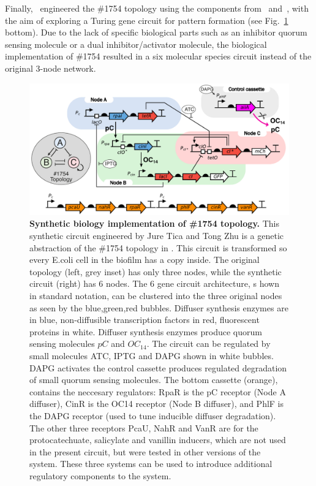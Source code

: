 Finally,~\cite{Tica2020} engineered the \#1754 topology using the components from~\cite{Meyer2019} and~\cite{Du2020}, with the aim of exploring a Turing gene circuit for pattern formation (see Fig.~\ref{fig:synthetic circuit} bottom).
Due to the lack of specific biological parts such as an inhibitor quorum sensing molecule or a dual inhibitor/activator molecule, the biological implementation of \#1754 resulted in a six molecular species circuit instead of the original 3-node network.

\begin{figure}[H]
    \centering
    \includegraphics[width=1\textwidth]{chapters/Chapter 2/synthetic circuit2}
    \caption{\textbf{Synthetic biology implementation of \#1754 topology.} This synthetic circuit engineered by Jure Tica and Tong Zhu is a genetic abstraction of the \#1754 topology in \cite{Scholes2019}. This circuit is transformed so every E.coli cell in the biofilm has a copy inside. The original topology (left, grey inset) has only three nodes, while the synthetic circuit (right) has 6 nodes. The 6 gene circuit architecture, s hown in standard notation, can be clustered into the three original nodes as seen by the blue,green,red bubbles. Diffuser synthesis enzymes are in blue, non-diffusible transcription
    factors in red, fluorescent proteins in white. Diffuser synthesis enzymes produce quorum sensing molecules $pC$ and $OC_{14}$. The circuit can be regulated by small molecules ATC, IPTG and DAPG shown in white bubbles. DAPG activates the control cassette produces regulated degradation of small quorum sensing molecules. The bottom cassette (orange), contains the neccesary regulators: RpaR is the pC receptor (Node A diffuser), CinR is the OC14 receptor (Node B diffuser), and PhlF is the DAPG receptor (used to tune inducible diffuser degradation). The other three receptors PcaU, NahR and VanR are for the protocatechuate, salicylate and vanillin inducers, which are not used in the present circuit, but were tested in other versions of the system. These three systems can be used to introduce additional regulatory components to the system. }
    \label{fig:synthetic circuit}
\end{figure}

